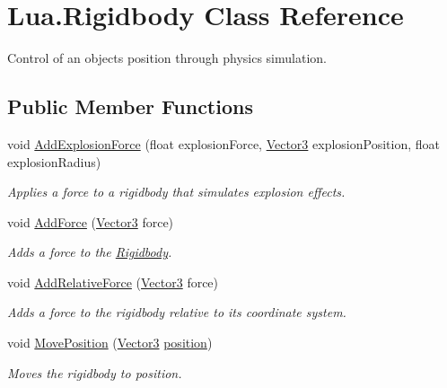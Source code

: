 \hypertarget{class_lua_1_1_rigidbody}{}\section{Lua.\+Rigidbody Class Reference}
\label{class_lua_1_1_rigidbody}


Control of an object\textquotesingle{}s position through physics simulation.  


\subsection*{Public Member Functions}
\begin{DoxyCompactItemize}
\item 
void \mbox{\hyperlink{class_lua_1_1_rigidbody_a5d57a953b33d659f6e3b5508cd304960}{Add\+Explosion\+Force}} (float explosion\+Force, \mbox{\hyperlink{class_lua_1_1_vector3}{Vector3}} explosion\+Position, float explosion\+Radius)
\begin{DoxyCompactList}\small\item\em Applies a force to a rigidbody that simulates explosion effects. \end{DoxyCompactList}\item 
void \mbox{\hyperlink{class_lua_1_1_rigidbody_a57eff3c6b45bf8f5a8dfdb7fa1fc9f8f}{Add\+Force}} (\mbox{\hyperlink{class_lua_1_1_vector3}{Vector3}} force)
\begin{DoxyCompactList}\small\item\em Adds a force to the \mbox{\hyperlink{class_lua_1_1_rigidbody}{Rigidbody}}. \end{DoxyCompactList}\item 
void \mbox{\hyperlink{class_lua_1_1_rigidbody_a9770aa2b61c085f2581392a782f6742c}{Add\+Relative\+Force}} (\mbox{\hyperlink{class_lua_1_1_vector3}{Vector3}} force)
\begin{DoxyCompactList}\small\item\em Adds a force to the rigidbody relative to its coordinate system. \end{DoxyCompactList}\item 
void \mbox{\hyperlink{class_lua_1_1_rigidbody_a413146fdf9b4e57b433cbc01dc1bc288}{Move\+Position}} (\mbox{\hyperlink{class_lua_1_1_vector3}{Vector3}} \mbox{\hyperlink{class_lua_1_1_rigidbody_a9bef020808bd389b43ac5d2f7d429dc9}{position}})
\begin{DoxyCompactList}\small\item\em Moves the rigidbody to position. \end{DoxyCompactList}\item 

\end{DoxyCompactItemize}
